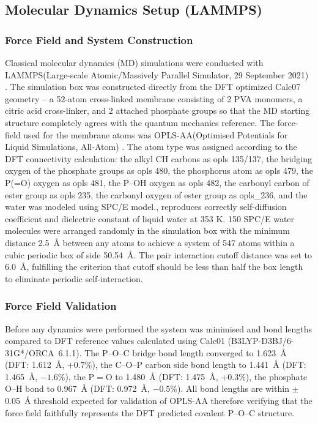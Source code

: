 \documentclass[12pt,a4paper]{report}
\begin{document}
\subsection{Molecular Dynamics Setup (LAMMPS)}

\subsubsection{Force Field and System Construction}

Classical molecular dynamics (MD) simulations were conducted with LAMMPS(Large-scale Atomic/Massively Parallel Simulator, 29 September 2021) \cite{104}. The simulation box was constructed directly from the DFT optimized Calc07 geometry – a 52-atom cross-linked membrane consisting of 2 PVA monomers, a citric acid cross-linker, and 2 attached phosphate groups so that the MD starting structure completely agrees with the quantum mechanics reference. The force-field used for the membrane atoms was OPLS-AA(Optimised Potentials for Liquid Simulations, All-Atom) \cite{95}. The atom type was assigned according to the DFT connectivity calculation: the alkyl CH carbons as opls 135/137, the bridging oxygen of the phosphate groups as opls 480, the phosphorus atom as opls 479, the P(=O) oxygen as opls 481, the P--OH oxygen as opls 482, the carbonyl carbon of ester group as opls 235, the carbonyl oxygen of ester group as opls\_236, and the water was modeled using SPC/E model.\cite{107}, reproduces correctly self-diffusion coefficient and dielectric constant of liquid water at 353 K. 150 SPC/E water molecules were arranged randomly in the simulation box with the minimum distance 2.5~Å between any atoms to achieve a system of 547 atoms within a cubic periodic box of side 50.54~\AA{}. The pair interaction cutoff distance was set to 6.0~\AA{}, fulfilling the criterion that cutoff should be less than half the box length to eliminate periodic self-interaction.

\subsubsection{Force Field Validation}

Before any dynamics were performed the system was minimised and bond lengths compared to DFT reference values calculated using Calc01 (B3LYP-D3BJ/6-31G*/ORCA~6.1.1). The P--O--C bridge bond length converged to 1.623~\AA{} (DFT: 1.612~\AA{}, $+0.7$\%), the C--O--P carbon side bond length to 1.441~\AA{} (DFT: 1.465~\AA{}, $-1.6$\%), the P\(=\)O to 1.480~\AA{} (DFT: 1.475~\AA{}, $+0.3$\%), the phosphate O--H bond to 0.967~\AA{} (DFT: 0.972~\AA{}, $-0.5$\%). All bond lengths are within \(\pm\)0.05~\AA{} threshold expected for validation of OPLS-AA\cite{95} therefore verifying that the force field faithfully represents the DFT predicted covalent P--O--C structure.
\end{document}
